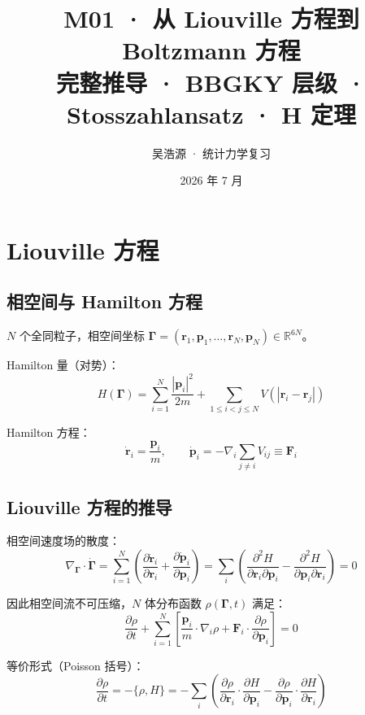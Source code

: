 \documentclass[11pt,a4paper]{article}
\title{\textbf{M01 · 从 Liouville 方程到 Boltzmann 方程}\\[6pt]
\large 完整推导 · BBGKY 层级 · Stosszahlansatz · H 定理}
\author{吴浩源 · 统计力学复习}
\date{2026 年 7 月}
\newcommand{\ri}{\mathbf{r}}
\newcommand{\piu}{\mathbf{p}}
\newcommand{\Gi}{\boldsymbol{\Gamma}}
\begin{document}
\maketitle
\tableofcontents
\newpage

\section{Liouville 方程}

\subsection{相空间与 Hamilton 方程}

$N$ 个全同粒子，相空间坐标 $\Gi = (\ri_1,\piu_1,\ldots,\ri_N,\piu_N) \in \mathbb{R}^{6N}$。

Hamilton 量（对势）：
\begin{equation}
H(\Gi) = \sum_{i=1}^N \frac{|\piu_i|^2}{2m} + \sum_{1\le i<j\le N} V(|\ri_i - \ri_j|)
\end{equation}

Hamilton 方程：
\begin{equation}
\dot{\ri}_i = \frac{\piu_i}{m}, \qquad \dot{\piu}_i = -\nabla_i \sum_{j\neq i} V_{ij} \equiv \mathbf{F}_i
\end{equation}

\subsection{Liouville 方程的推导}

相空间速度场的散度：
\begin{equation}
\nabla_{\Gi} \cdot \dot{\Gi} 
= \sum_{i=1}^N \left(\frac{\partial \dot{\ri}_i}{\partial \ri_i} + \frac{\partial \dot{\piu}_i}{\partial \piu_i}\right)
= \sum_i \left(\frac{\partial^2 H}{\partial \ri_i \partial \piu_i} - \frac{\partial^2 H}{\partial \piu_i \partial \ri_i}\right) = 0
\end{equation}

因此相空间流不可压缩，$N$ 体分布函数 $\rho(\Gi,t)$ 满足：
\begin{equation}
\boxed{\frac{\partial \rho}{\partial t} + \sum_{i=1}^N \left[\frac{\piu_i}{m}\cdot\nabla_i \rho + \mathbf{F}_i \cdot \frac{\partial \rho}{\partial \piu_i}\right] = 0}
\end{equation}

等价形式（Poisson 括号）：
\begin{equation}
\frac{\partial \rho}{\partial t} = -\{\rho, H\} = -\sum_i\left(\frac{\partial \rho}{\partial \ri_i}\cdot\frac{\partial H}{\partial \piu_i} - \frac{\partial \rho}{\partial \piu_i}\cdot\frac{\partial H}{\partial \ri_i}\right)
\end{equation}
\end{document}
